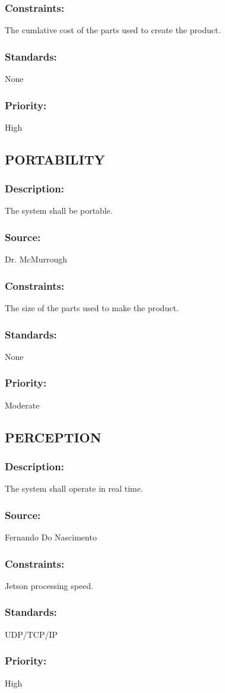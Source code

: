 \subsubsection{Constraints:} 
	{The cumlative cost of the parts used to create the product.}
\subsubsection{Standards:} 
	{None}
\subsubsection{Priority:} 
	{High}
\newline

\subsection{\text PORTABILITY}
\subsubsection{Description:} 
	{The system shall be portable.}
\subsubsection{Source:} 
	{Dr. McMurrough}
\subsubsection{Constraints:} 
	{The size of the parts used to make the product.}
\subsubsection{Standards:} 
	{None}
\subsubsection{Priority:} 
	{Moderate}
\newline
	
\subsection{\text PERCEPTION}
\subsubsection{Description:} 
	{The system shall operate in real time.}
\subsubsection{Source:} 
	{Fernando Do Nascimento}
\subsubsection{Constraints:} 
	{Jetson processing speed.}
\subsubsection{Standards:} 
	{UDP/TCP/IP}
\subsubsection{Priority:} 
	{High}
